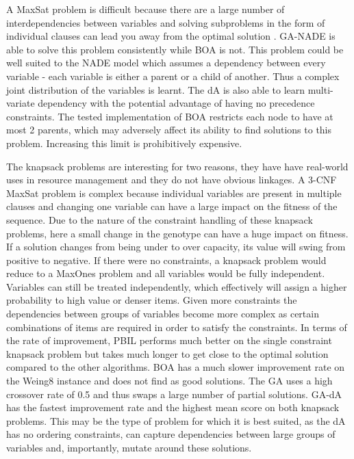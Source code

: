 \documentclass[twoside]{article}
\begin{document}
A MaxSat problem is difficult because there are a large number of interdependencies between variables and solving subproblems in the form of individual clauses can lead you away from the optimal solution \citep{rana1998genetic}. GA-NADE is able to solve this problem consistently while BOA is not. This problem could be well suited to the NADE model which assumes a dependency between every variable - each variable is either a parent or a child of another. Thus a complex joint distribution of the variables is learnt. The dA is also able to learn multi-variate dependency with the potential advantage of having no precedence constraints. The tested implementation of BOA restricts each node to have at most 2 parents, which may adversely affect its ability to find solutions to this problem. Increasing this limit is prohibitively expensive.

The knapsack problems are interesting for two reasons, they have have real-world uses in resource management and they do not have obvious linkages. A 3-CNF MaxSat problem is complex because individual variables are present in multiple clauses and changing one variable can have a large impact on the fitness of the sequence. Due to the nature of the constraint handling of these knapsack problems, here a small change in the genotype can have a huge impact on fitness. If a solution changes from being under to over capacity, its value will swing from positive to negative. If there were no constraints, a knapsack problem would reduce to a MaxOnes problem and all variables would be fully independent. Variables can still be treated independently, which effectively will assign a higher probability to high value or denser items. Given more constraints the dependencies between groups of variables become more complex as certain combinations of items are required in order to satisfy the constraints. In terms of the rate of improvement, PBIL performs much better on the single constraint knapsack problem but takes much longer to get close to the optimal solution compared to the other algorithms. BOA has a much slower improvement rate on the Weing8 instance and does not find as good solutions. The GA uses a high crossover rate of 0.5 and thus swaps a large number of partial solutions. GA-dA has the fastest improvement rate and the highest mean score on both knapsack problems. This may be the type of problem for which it is best suited, as the dA has no ordering constraints, can capture dependencies between large groups of variables and, importantly, mutate around these solutions.
\end{document}
